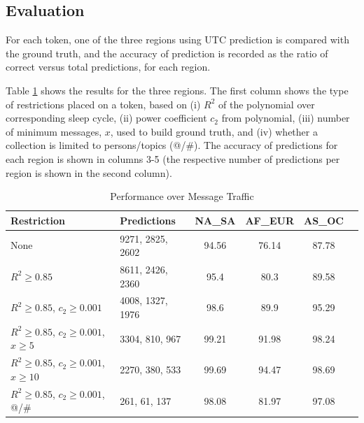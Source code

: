 \subsection{Evaluation}\label{ms-evaluation}
For each token, one of the three regions using UTC prediction is compared with the ground truth, and the accuracy of prediction
is recorded as the ratio of correct versus total predictions, for each region. 

Table \ref{table_M2} shows the results for the three regions. 
The first column shows the type of restrictions placed on a token, %
based on (i) $R^2$ of the polynomial over corresponding sleep cycle, (ii) power coefficient $c_2$ from polynomial, (iii) number of minimum messages, $x$, used to build ground truth, and (iv) whether a collection is limited to persons/topics (@/\#). The accuracy of predictions for each region is shown in columns 3-5 (the respective number of predictions per region is shown in the second column).


\begin{table}[htbp]
\small
\caption{Performance over Message Traffic}
\label{table_M2}
\centering
\begin{tabular}{|l|l|c|c|c|c|}
\hline
\bfseries Restriction & \bfseries Predictions & \bfseries NA\_SA & \bfseries AF\_EUR & \bfseries AS\_OC\\
\hline
None & 9271, 2825, 2602 & 94.56 & 76.14 & 87.78\\
\hline
$R^2\geq0.85$ & 8611, 2426, 2360 & 95.4 & 80.3 & 89.58\\
\hline
$R^2\geq0.85$, $c_2\geq0.001$ & 4008, 1327, 1976 & 98.6 & 89.9 & 95.29\\
\hline
$R^2\geq0.85$, $c_2\geq0.001$, $x\geq5$ & 3304, 810, 967 & 99.21 & 91.98 & 98.24\\
\hline
$R^2\geq0.85$, $c_2\geq0.001$, $x\geq10$ & 2270, 380, 533 & 99.69 & 94.47 & 98.69\\
\hline
$R^2\geq0.85$, $c_2\geq0.001$, @/\# & 261, 61, 137 & 98.08 & 81.97 & 97.08\\
\hline
\end{tabular}
\end{table}

